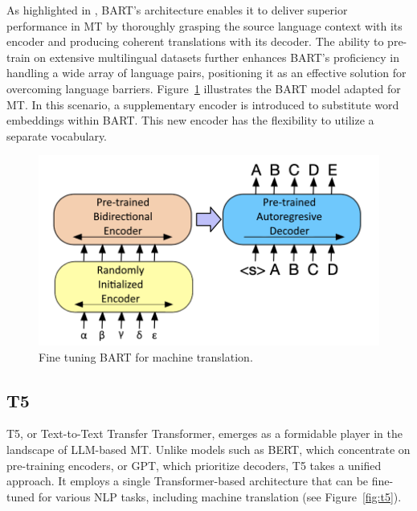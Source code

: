 As highlighted in \cite{lewis19}, BART's architecture enables it to deliver superior performance in MT by thoroughly grasping the source language context with its encoder and producing coherent translations with its decoder. 
The ability to pre-train on extensive multilingual datasets further enhances BART's proficiency in handling a wide array of language pairs, positioning it as an effective solution for overcoming language barriers.
Figure~\ref{fig:bart} illustrates the BART model adapted for MT. In this scenario, a supplementary encoder is introduced to substitute word embeddings within BART. This new encoder has the flexibility to utilize a separate vocabulary.
\begin{figure}[h]
	\centering
	\includegraphics[width=0.7\linewidth]{Figures/Bart}
	\caption{Fine tuning BART for machine translation.}
	\label{fig:bart}
\end{figure}

\subsection{T5}
T5, or Text-to-Text Transfer Transformer, emerges as a formidable player in the landscape of LLM-based MT. 
Unlike models such as BERT, which concentrate on pre-training encoders, or GPT, which prioritize decoders, T5 takes a unified approach. 
It employs a single Transformer-based architecture that can be fine-tuned for various NLP tasks, including machine translation (see Figure~\ref{fig:t5}).

